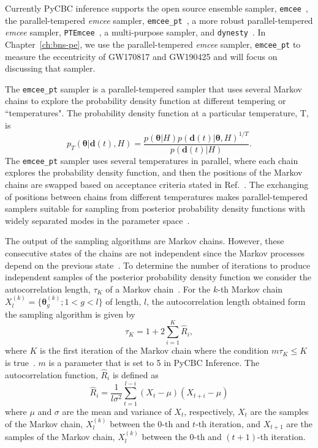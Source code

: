 Currently PyCBC inference supports the open source ensemble sampler, \texttt{emcee}~\cite{ForemanMackey:2012ig}, the parallel-tempered \textit{emcee} sampler, \texttt{emcee\_pt}~\cite{ForemanMackey:2012ig,emceept}, a more robust parallel-tempered \textit{emcee} sampler, \texttt{PTEmcee}~\cite{ForemanMackey:2012ig,emceept}, a multi-purpose sampler, and \texttt{dynesty}~\cite{Speagle:2019ivv}. In Chapter~\ref{ch:bns-pe}, we use the parallel-tempered \textit{emcee} sampler, \texttt{emcee\_pt} to measure the eccentricity of GW170817 and GW190425 and will focus on discussing that sampler.

The \texttt{emcee\_pt} sampler is a parallel-tempered sampler that uses several Markov chains to explore the probability density function at different tempering or ``temperatures". The probability density function at a particular temperature, T, is
\begin{equation}
    p_T(\boldsymbol{\theta}|\boldsymbol{d}(t),H) = \frac{p(\boldsymbol{\theta}|H) p(\boldsymbol{d}(t)|\boldsymbol{\theta},H)^{1/T}}{p(\boldsymbol{d}(t)|H)}.
\end{equation}
The \texttt{emcee\_pt} sampler uses several temperatures in parallel, where each chain explores the probability density function, and then the positions of the Markov chains are swapped based on acceptance criteria stated in Ref.~\cite{emceept}. The exchanging of positions between chains from different temperatures makes parallel-tempered samplers suitable for sampling from posterior probability density functions with widely separated modes in the parameter space~\cite{emceept}.

The output of the sampling algorithms are Markov chains. However, these consecutive states of the chains are not independent since the Markov processes depend on the previous state~\cite{Christensen:2004jm}. To determine the number of iterations to produce independent samples of the posterior probability density function we consider the autocorrelation length, $\tau_K$ of a Markov chain~\cite{Madras:1988ei}. For the $k$-th Markov chain $X_l^{(k)}= \{\boldsymbol{\theta}_g^{(k)}; 1 < g < l\}$ of length, $l$, the autocorrelation length obtained form the sampling algorithm is given by
\begin{equation}\label{autocorrelation}
    \tau_K = 1 + 2 \sum_{i=1}^K\hat{R}_i,
\end{equation}
where $K$ is the first iteration of the Markov chain where the condition $m\tau_K \leqslant K$ is true~\cite{Madras:1988ei}. $m$ is a parameter that is set to 5 in PyCBC Inference. The autocorrelation function, $\hat{R}_i$ is defined as~\cite{Madras:1988ei}
\begin{equation}
    \hat{R}_i = \frac{1}{l\sigma^2}\sum_{t=1}^{l-i}(X_t-\mu)(X_{t+i}-\mu)
\end{equation}
where $\mu$ and $\sigma$ are the mean and variance of $X_t$, respectively, $X_t$ are the samples of the Markov chain, $X_l^{(k)}$ between the $0$-th and $t$-th iteration, and $X_{t+1}$ are the samples of the Markov chain, $X_l^{(k)}$ between the $0$-th and $(t+1)$-th iteration. 

